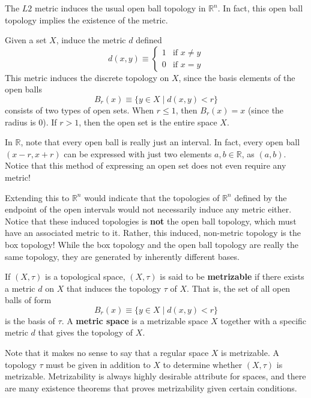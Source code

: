 \documentclass{article}
\begin{document}
    \begin{example}
    The $L2$ metric induces the usual open ball topology in $\mathbb{R}^n$. In fact, this open ball topology implies the existence of the metric. 
    \end{example}

    \begin{example}
    Given a set $X$, induce the metric $d$ defined
    \[d(x, y) \equiv \begin{cases}
          1 & \text{if } x \neq y \\
          0 & \text{if } x = y
    \end{cases}\]
    This metric induces the discrete topology on $X$, since the basis elements of the open balls
    \[B_r (x) \equiv \{ y \in X \; | \; d(x, y) <r\}\]
    consists of two types of open sets. When $r \leq 1$, then $B_r (x) = x$ (since the radius is $0$). If $r > 1$, then the open set is the entire space $X$. 
    \end{example}

    In $\mathbb{R}$, note that every open ball is really just an interval. In fact, every open ball $(x - r, x + r)$ can be expressed with just two elements $a, b \in \mathbb{R}$, as $(a, b)$. Notice that this method of expressing an open set does not even require any metric! 

    Extending this to $\mathbb{R}^n$ would indicate that the topologies of $\mathbb{R}^n$ defined by the endpoint of the open intervals would not necessarily induce any metric either. Notice that these induced topologies is \textbf{not} the open ball topology, which must have an associated metric to it. Rather, this induced, non-metric topology is the box topology! While the box topology and the open ball topology are really the same topology, they are generated by inherently different bases. 

    \begin{definition}
    If $(X, \tau)$ is a topological space, $(X, \tau)$ is said to be \textbf{metrizable} if there exists a metric $d$ on $X$ that induces the topology $\tau$ of $X$. That is, the set of all open balls of form
    \[B_r (x) \equiv \{ y \in X \; | \; d(x, y) < r \}\]
    is the basis of $\tau$. A \textbf{metric space} is a metrizable space $X$ together with a specific metric $d$ that gives the topology of $X$. 
    \end{definition}

    Note that it makes no sense to say that a regular space $X$ is metrizable. A topology $\tau$ must be given in addition to $X$ to determine whether $(X, \tau)$ is metrizable. Metrizability is always highly desirable attribute for spaces, and there are many existence theorems that proves metrizability given certain conditions. 
\end{document}
